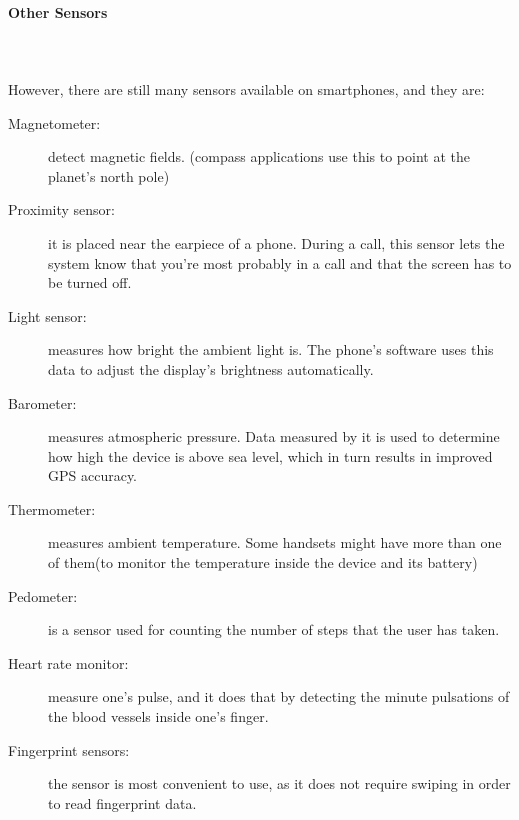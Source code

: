 \documentclass[tesi]{subfiles}
\begin{document}
\clearpage
\paragraph{{\Large Other Sensors}}\leavevmode\\\\
However, there are still many sensors available on smartphones, and they are:
\begin{description}
\item[Magnetometer:] detect magnetic fields. (compass applications use this to point at the planet's north pole)
\item[Proximity sensor:] it is placed near the earpiece of a phone. During a call, this sensor lets the system know that you're most probably in a call and that the screen has to be turned off.
\item[Light sensor:] measures how bright the ambient light is. The phone's software uses this data to adjust the display's brightness automatically.
\item[Barometer:] measures atmospheric pressure. Data measured by it is used to determine how high the device is above sea level, which in turn results in improved GPS accuracy. 
\item[Thermometer:] measures ambient temperature. Some handsets might have more than one of them(to monitor the temperature inside the device and its battery)
\item[Pedometer:] is a sensor used for counting the number of steps that the user has taken.
\item[Heart rate monitor:] measure one's pulse, and it does that by detecting the minute pulsations of the blood vessels inside one's finger.
\item[Fingerprint sensors:] the sensor is most convenient to use, as it does not require swiping in order to read fingerprint data.
\end{description}
\clearpage
\end{document}
